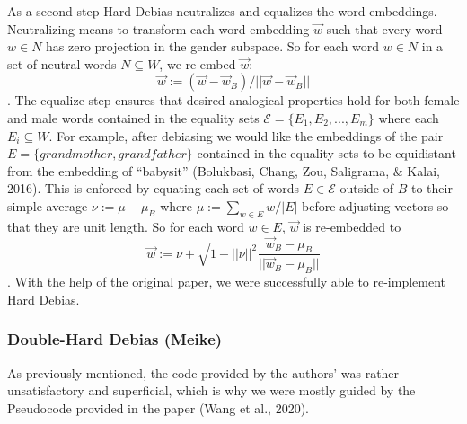 \documentclass[
  english,
  man,floatsintext]{apa6}
\begin{document}
As a second step Hard Debias neutralizes and equalizes the word embeddings. Neutralizing means to transform each word embedding \(\vec{w}\) such that every word \(w\in N\) has zero projection in the gender subspace. So for each word \(w\in N\) in a set of neutral words \(N \subseteq W\), we re-embed \(\vec{w}\): \[\vec{w}:=(\vec{w}-\vec{w}_B)/||\vec{w}-\vec{w}_B||\]. The equalize step ensures that desired analogical properties hold for both female and male words contained in the equality sets \(\mathcal{E}=\{E_1,E_2,...,E_m\}\) where each \(E_i \subseteq W\). For example, after debiasing we would like the embeddings of the pair \(E=\{grandmother, grandfather\}\) contained in the equality sets to be equidistant from the embedding of ``babysit'' (Bolukbasi, Chang, Zou, Saligrama, \& Kalai, 2016). This is enforced by equating each set of words \(E\in \mathcal{E}\) outside of \(B\) to their simple average \(\nu:=\mu-\mu_B\) where \(\mu:=\sum_{w\in E}w/|E|\) before adjusting vectors so that they are unit length. So for each word \(w\in E\), \(\vec{w}\) is re-embedded to \[\vec{w}:=\nu+\sqrt{1-||\nu||^2}\frac{\vec{w}_B-\mu_B}{||\vec{w}_B-\mu_B||}\].
With the help of the original paper, we were successfully able to re-implement Hard Debias.

\hypertarget{double-hard-debias-meike}{%
\subsubsection{Double-Hard Debias (Meike)}\label{double-hard-debias-meike}}

As previously mentioned, the code provided by the authors' was rather unsatisfactory and superficial, which is why we were mostly guided by the Pseudocode provided in the paper (Wang et al., 2020).
\end{document}

